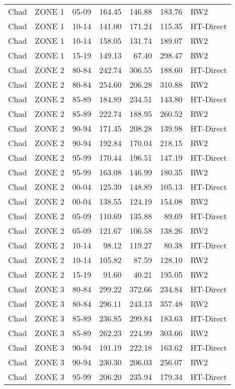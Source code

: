 \begin{longtable}{lllrrrl}
  Chad & ZONE 1 & 05-09 & 164.45 & 146.88 & 183.76 & RW2 \\ 
  Chad & ZONE 1 & 10-14 & 141.00 & 171.24 & 115.35 & HT-Direct \\ 
  Chad & ZONE 1 & 10-14 & 158.05 & 131.74 & 189.07 & RW2 \\ 
  Chad & ZONE 1 & 15-19 & 149.13 & 67.40 & 298.47 & RW2 \\ 
  Chad & ZONE 2 & 80-84 & 242.74 & 306.55 & 188.60 & HT-Direct \\ 
  Chad & ZONE 2 & 80-84 & 254.60 & 206.28 & 310.88 & RW2 \\ 
  Chad & ZONE 2 & 85-89 & 184.89 & 234.51 & 143.80 & HT-Direct \\ 
  Chad & ZONE 2 & 85-89 & 222.74 & 188.95 & 260.52 & RW2 \\ 
  Chad & ZONE 2 & 90-94 & 171.45 & 208.28 & 139.98 & HT-Direct \\ 
  Chad & ZONE 2 & 90-94 & 192.84 & 170.04 & 218.15 & RW2 \\ 
  Chad & ZONE 2 & 95-99 & 170.44 & 196.51 & 147.19 & HT-Direct \\ 
  Chad & ZONE 2 & 95-99 & 163.08 & 146.99 & 180.35 & RW2 \\ 
  Chad & ZONE 2 & 00-04 & 125.39 & 148.89 & 105.13 & HT-Direct \\ 
  Chad & ZONE 2 & 00-04 & 138.55 & 124.19 & 154.08 & RW2 \\ 
  Chad & ZONE 2 & 05-09 & 110.69 & 135.88 & 89.69 & HT-Direct \\ 
  Chad & ZONE 2 & 05-09 & 121.67 & 106.58 & 138.26 & RW2 \\ 
  Chad & ZONE 2 & 10-14 & 98.12 & 119.27 & 80.38 & HT-Direct \\ 
  Chad & ZONE 2 & 10-14 & 105.82 & 87.59 & 128.10 & RW2 \\ 
  Chad & ZONE 2 & 15-19 & 91.60 & 40.21 & 195.05 & RW2 \\ 
  Chad & ZONE 3 & 80-84 & 299.22 & 372.66 & 234.84 & HT-Direct \\ 
  Chad & ZONE 3 & 80-84 & 296.11 & 243.13 & 357.48 & RW2 \\ 
  Chad & ZONE 3 & 85-89 & 236.85 & 299.84 & 183.63 & HT-Direct \\ 
  Chad & ZONE 3 & 85-89 & 262.23 & 224.99 & 303.66 & RW2 \\ 
  Chad & ZONE 3 & 90-94 & 191.19 & 222.18 & 163.62 & HT-Direct \\ 
  Chad & ZONE 3 & 90-94 & 230.30 & 206.03 & 256.07 & RW2 \\ 
  Chad & ZONE 3 & 95-99 & 206.20 & 235.94 & 179.34 & HT-Direct \\ 

\end{longtable}
